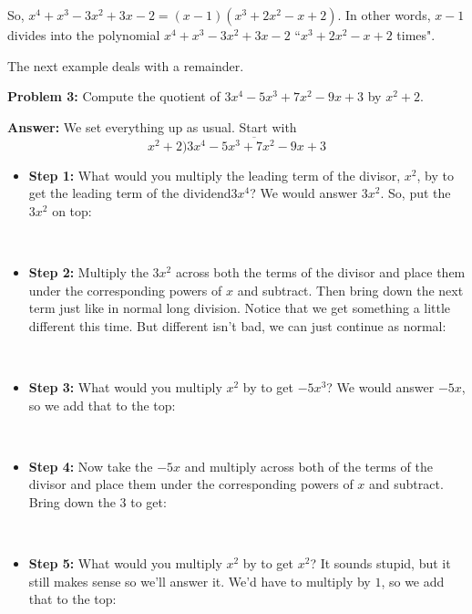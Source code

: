 \documentclass[letterpaper,11pt]{amsart}
\theoremstyle{plain}
\theoremstyle{definition}
\theoremstyle{remark}
\newcommand{\<}{\langle}
\renewcommand{\>}{\rangle}
\begin{document}
So, $x^4+x^3-3x^2+3x-2 = (x-1) ( x^3+2x^2-x+2)$.  In other words, $x-1$ divides into the polynomial $x^4+x^3-3x^2+3x-2$ ``$x^3+2x^2-x+2$ times".  \\

 \newpage
 
 The next example deals with a remainder.
 
 \textbf{Problem 3:}  Compute the quotient of $3x^4-5x^3+7x^2-9x+3$ by $x^2+2$.
 
 \textbf{Answer:} We set everything up as usual.  Start with $$x^2+2 \overline{)3x^4-5x^3+7x^2-9x+3}$$   

\begin{itemize}
\item \textbf{Step 1:}  What would you multiply the leading term of the divisor, $x^2$, by to get the leading term of the dividend$3x^4$?  We would answer $3x^2$.  So, put the $3x^2$ on top:

\\

\item \textbf{Step 2:}  Multiply the $3x^2$ across both the terms of the divisor and place them under the corresponding powers of $x$ and subtract.  Then bring down the next term just like in normal long division.  Notice that we get something a little different this time.  But different isn't bad, we can just continue as normal:

\\

\item \textbf{Step 3:} What would you multiply $x^2$ by to get $-5x^3$?  We would answer $-5x$, so we add that to the top:

\\

\item \textbf{Step 4:} Now take the $-5x$ and multiply across both of the terms of the divisor and place them under the corresponding powers of $x$ and subtract.  Bring down the $3$ to get:

\\



\item \textbf{Step 5:} What would you multiply $x^2$ by to get $x^2$?  It sounds stupid, but it still makes sense so we'll answer it.  We'd have to multiply by $1$, so we add that to the top:


\end{itemize}
\end{document}

